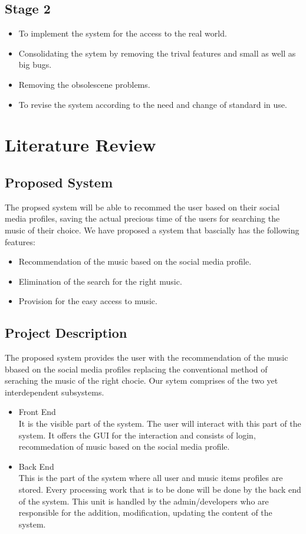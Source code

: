 \documentclass{article}
\begin{document}
\subsection{Stage 2}
\begin{itemize}
	\item To implement the system for the access to the real world.
	\item Consolidating the sytem by removing the trival features and small as well as big bugs.
	\item Removing the obsolescene problems.
	\item To revise the system according to the need and change of standard in use.
\end{itemize}

\cleardoublepage

\section{Literature Review}
\subsection{Proposed System}
	The propsed system will be able to recommed the user based on their social media profiles, saving the actual precious time of the users for searching the music of their choice. We have proposed a system that bascially has the following features:
\begin{itemize}
	\item Recommendation of the music based on the social media profile.
	\item Elimination of the search for the right music.
	\item Provision for the easy access to music.
\end{itemize}
\subsection{Project Description}
The proposed system provides the user with the recommendation of the music bbased on the social media profiles replacing the conventional method of seraching the music of the right chocie.
Our sytem comprises of the two yet interdependent subsystems.
\begin{itemize}
	\item Front End \\
		It is the visible part of the system. The user will interact with this part of the system. It offers the GUI for the interaction and consists of login, recommedation of music based on the social media profile.
	\item Back End \\
		This is the part of the system where all user and music items profiles are stored. Every processing work that is to be done will be done by the back end of the system. This unit is handled by the admin/developers who are responsible for the addition, modification, updating the content of the system.
\end{itemize}
\cleardoublepage
\end{document}
